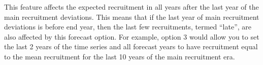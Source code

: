 This feature affects the expected recruitment in all years after the last year of the main recruitment deviations. This means that if the last year of main recruitment deviations is before end year, then the last few recruitments, termed ``late'', are also affected by this forecast option. For example, option 3 would allow you to set the last 2 years of the time series and all forecast years to have recruitment equal to the mean recruitment for the last 10 years of the main recruitment era.

\pagebreak
